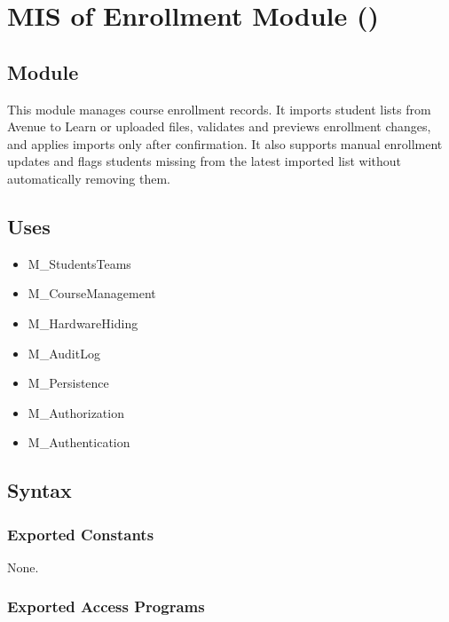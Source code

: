 \documentclass[12pt, titlepage]{article}
\newcommand{\moduleid}[1]{\texttt{\detokenize{#1}}}
\begin{document}
\newpage

\section[MIS of Enrollment Module]{MIS of Enrollment Module (\moduleid{M_Enrollment})}
\label{M_Enrollment}

\subsection{Module}

This module manages course enrollment records. It imports student lists from Avenue to Learn or uploaded files, validates and previews enrollment changes, and applies imports only after confirmation. It also supports manual enrollment updates and flags students missing from the latest imported list without automatically removing them.

\subsection{Uses}

\begin{itemize}
    \item M\_StudentsTeams
    \item M\_CourseManagement
    \item M\_HardwareHiding
    \item M\_AuditLog
    \item M\_Persistence
    \item M\_Authorization
    \item M\_Authentication
\end{itemize}

\subsection{Syntax}

\subsubsection{Exported Constants}
None.

\subsubsection{Exported Access Programs}
\end{document}
